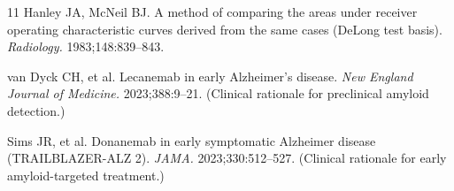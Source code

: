 \documentclass{article}
\begin{document}
\begin{thebibliography}{11}
Hanley JA, McNeil BJ.
A method of comparing the areas under receiver operating characteristic curves
derived from the same cases (DeLong test basis).
\textit{Radiology.} 1983;148:839--843.

van Dyck CH, et al.
Lecanemab in early Alzheimer's disease.
\textit{New England Journal of Medicine.} 2023;388:9--21.
(Clinical rationale for preclinical amyloid detection.)

Sims JR, et al.
Donanemab in early symptomatic Alzheimer disease (TRAILBLAZER-ALZ 2).
\textit{JAMA.} 2023;330:512--527.
(Clinical rationale for early amyloid-targeted treatment.)

\end{thebibliography}
\end{document}
